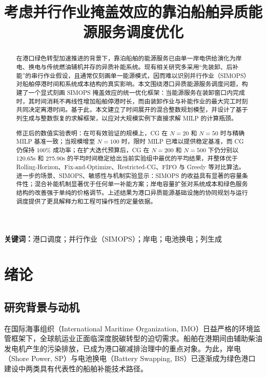 \documentclass[UTF8, a4paper, 12pt]{ctexart}
\begin{document}
\title{\heiti{} 考虑并行作业掩盖效应的靠泊船舶异质能源服务调度优化}
\author{}
\date{}
\maketitle

\begin{abstract}
在港口绿色转型加速推进的背景下，靠泊船舶的能源服务已由单一岸电供给演化为岸电、换电与传统燃油辅机并存的异质补能系统。现有相关研究多采用“先装卸、后补能”的串行作业假设，且通常仅刻画单一能源模式，因而难以识别并行作业（SIMOPS）对船舶停港时间和系统成本结构的真实影响。本文围绕港口异质能源服务调度问题，构建了一个显式刻画 SIMOPS 掩盖效应的统一优化框架：当能源服务在装卸窗口内完成时，其时间消耗不再线性增加船舶停港时长，而由装卸作业与补能作业的最大完工时刻共同决定离港时间。基于此，本文建立了时间展开的混合整数规划模型，并设计了基于列生成与整数恢复的求解框架，以应对大规模实例下直接求解 MILP 的计算瓶颈。

修正后的数值实验表明：在可有效验证的规模上，CG 在 $N=20$ 和 $N=50$ 时与精确 MILP 基准一致；当规模增至 $N=100$ 时，限时 MILP 已难以提供稳定基准，而 CG 仍保持 100\% 成功率；在扩大迭代预算后，CG 在 $N=200$ 和 $N=500$ 下仍分别以 120.65s 和 275.90s 的平均时间稳定给出当前实验组中最优的平均结果，并整体优于 Rolling-Horizon、Fix-and-Optimize、Restricted-CG、FIFO 与 Greedy 等对比算法。进一步的场景、SIMOPS、敏感性与机制实验显示：SIMOPS 的收益具有显著的容量条件性；混合补能机制显著优于任何单一补能方案；岸电容量扩张对系统成本和绿色服务结构的改善强于单纯的价格调节。上述结果为港口异质能源基础设施的协同规划与运行调度提供了更具解释力和工程可操作性的定量依据。
\end{abstract}

\noindent\textbf{关键词：}港口调度；并行作业（SIMOPS）；岸电；电池换电；列生成

\section{绪论}
\label{sec:intro}

\subsection{研究背景与动机}
在国际海事组织（International Maritime Organization, IMO）日益严格的环境监管框架下，全球航运业正面临深度脱碳转型的迫切需求。船舶在港期间由辅助柴油发电机产生的污染排放，已成为港口碳减排治理中的重点对象。为此，岸电（Shore Power, SP）与电池换电（Battery Swapping, BS）已逐渐成为绿色港口建设中两类具有代表性的船舶补能技术路径。
 
\end{document}
